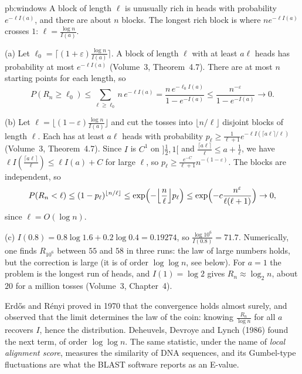 \begin{solution}{pb:windows}
\idea A block of length $\ell$ is unusually rich in heads with probability $e^{-\ell I(a)}$, and there are about $n$ blocks. The longest rich block is where $ne^{-\ell I(a)}$
crosses $1$: $\ell=\frac{\log n}{I(a)}$.

\writeup (a) Let $\ell_0=\lceil(1+\varepsilon)\frac{\log n}{I(a)}\rceil$. A block of length $\ell$ with at least $a\ell$ heads has probability at most $e^{-\ell I(a)}$ (Volume~3,
Theorem~4.7). There are at most $n$ starting points for each length, so
\[
P(R_n\ge\ell_0)\le\sum_{\ell\ge\ell_0}n\,e^{-\ell I(a)}=\frac{n\,e^{-\ell_0I(a)}}{1-e^{-I(a)}}\le\frac{n^{-\varepsilon}}{1-e^{-I(a)}}\to0.
\]

(b) Let $\ell=\lfloor(1-\varepsilon)\frac{\log n}{I(a)}\rfloor$ and cut the tosses into $\lfloor n/\ell\rfloor$ disjoint blocks of length $\ell$. Each has at least $a\ell$ heads with
probability $p_\ell\ge\frac1{\ell+1}e^{-\ell I(\lceil a\ell\rceil/\ell)}$ (Volume~3, Theorem~4.7). Since $I$ is $C^1$ on $]\frac12,1[$ and $\frac{\lceil a\ell\rceil}\ell\le a+\frac1\ell$, we have
$\ell I(\frac{\lceil a\ell\rceil}\ell)\le\ell I(a)+C$ for large $\ell$, so $p_\ell\ge\frac{e^{-C}}{\ell+1}n^{-(1-\varepsilon)}$. The blocks are independent, so
\[
P(R_n<\ell)\le(1-p_\ell)^{\lfloor n/\ell\rfloor}\le\exp\Bigl(-\Bigl\lfloor\frac n\ell\Bigr\rfloor p_\ell\Bigr)\le\exp\Bigl(-c\frac{n^\varepsilon}{\ell(\ell+1)}\Bigr)\to0,
\]
since $\ell=O(\log n)$.

(c) $I(0.8)=0.8\log1.6+0.2\log0.4=0.19274$, so $\frac{\log10^6}{I(0.8)}=71.7$. Numerically, one finds $R_{10^6}$ between $55$ and $58$ in three runs: the law of large numbers
holds, but the correction is large (it is of order $\log\log n$, see below). For $a=1$ the problem is the longest run of heads, and $I(1)=\log2$ gives $R_n\approx\log_2n$,
about $20$ for a million tosses (Volume~3, Chapter~4).

\leads Erd\H os and R\'enyi proved in 1970 that the convergence holds almost surely, and observed that the limit determines the law of the coin: knowing $\frac{R_n}{\log n}$ for
all $a$ recovers $I$, hence the distribution. Deheuvels, Devroye and Lynch (1986) found the next term, of order $\log\log n$. The same statistic, under the name of
\emph{local alignment score}, measures the similarity of DNA sequences, and its Gumbel-type fluctuations are what the BLAST software reports as an E-value.
\end{solution}

